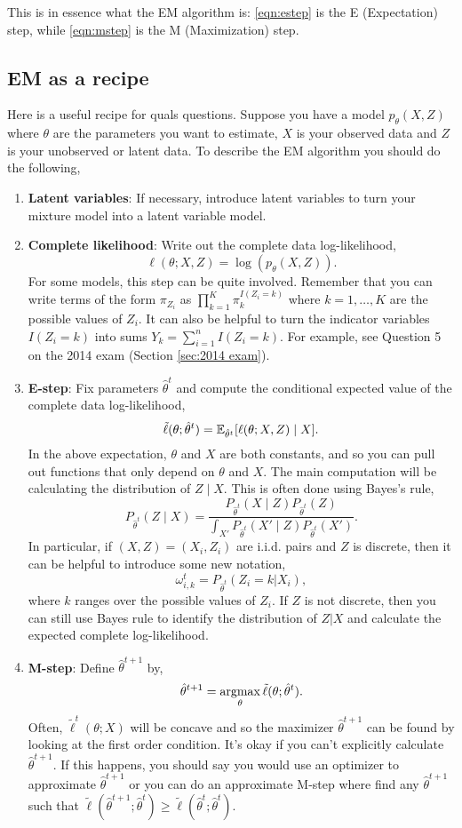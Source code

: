 This is in essence what the EM algorithm is: \eqref{eqn:estep} is the E (Expectation) step, while \eqref{eqn:mstep} is the M (Maximization) step.


\subsection{EM as a recipe}

Here is a useful recipe for quals questions. Suppose you have a model $p_{\theta}(X,Z)$ where $\theta$ are the parameters you want to estimate, $X$ is your observed data and $Z$ is your unobserved or latent data. To describe the EM algorithm you should do the following,
\begin{enumerate}[start = 0]
    \item \textbf{Latent variables}: If necessary, introduce latent variables to turn your mixture model into a latent variable model.
    \item \textbf{Complete likelihood}: Write out the complete data log-likelihood,
    \[\ell(\theta;X,Z)= \log(p_\theta(X,Z)). \]
    For some models, this step can be quite involved. Remember that you can write terms of the form $\pi_{Z_i}$ as $\prod_{k=1}^K \pi_k^{I(Z_i=k)}$ where $k=1,\ldots,K$ are the possible values of $Z_i$. It can also be helpful to turn the indicator variables $I(Z_i=k)$ into sums $Y_k = \sum_{i=1}^n I(Z_i=k)$. For example, see Question 5 on the 2014 exam (Section \ref{sec:2014 exam}).
    \item \textbf{E-step}: Fix parameters $\hat{\theta}^t$ and compute the conditional expected value of the complete data log-likelihood,
    \[\tilde{\ell}(\theta;\hat{\theta}^t) = {\mathbb E}_{\hat{\theta}^t}[\ell(\theta;X,Z)\mid X].  \]
    In the above expectation, $\theta$ and $X$ are both constants, and so you can pull out functions that only depend on $\theta$ and $X$. The main computation will be calculating the distribution of $Z \mid X$. This is often done using Bayes's rule,
    \[P_{\hat{\theta}^t}(Z \mid X)  = \frac{P_{\hat{\theta}^t}(X \mid Z)P_{\hat{\theta}^t}(Z)}{\int_{X'}P_{\hat{\theta}^t}(X' \mid Z)P_{\hat{\theta}^t}(X')}. \]
    In particular, if $(X,Z) = (X_i,Z_i)$ are i.i.d. pairs and $Z$ is discrete, then it can be helpful to introduce some new notation, 
    \[\omega_{i,k}^t = P_{\hat{\theta}^t}(Z_i=k|X_i), \]
    where $k$ ranges over the possible values of $Z_i$. If $Z$ is not discrete, then you can still use Bayes rule to identify the distribution of $Z|X$ and calculate the expected complete log-likelihood.
    \item \textbf{M-step}: Define $\hat{\theta}^{t+1}$ by,
    \[\hat{\theta}^{t+1}  = \operatorname*{argmax}_{\theta} \tilde{\ell}(\theta;\hat{\theta}^t). \]
    Often, $\tilde{\ell}^t(\theta;X)$ will be concave and so the maximizer $\hat{\theta}^{t+1}$ can be found by looking at the first order condition. It's okay if you can't explicitly calculate $\hat{\theta}^{t+1}$. If this happens, you should say you would use an optimizer to approximate $\hat{\theta}^{t+1}$ or you can do an approximate M-step where find any $\hat{\theta}^{t+1}$ such that $\tilde{\ell}(\hat{\theta}^{t+1}; \hat{\theta}^t) \ge \tilde{\ell}(\hat{\theta}^{t}; \hat{\theta}^t)$.
\end{enumerate}

